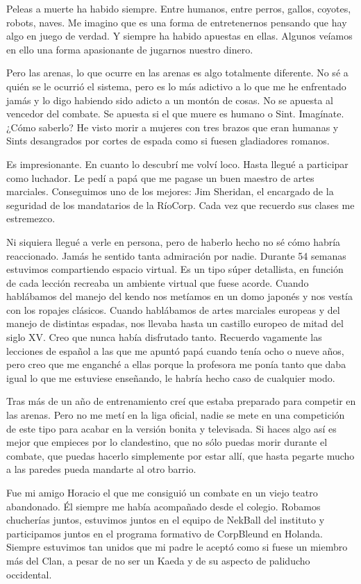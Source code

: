 Peleas a muerte ha habido siempre. Entre humanos, entre perros, gallos, coyotes, robots, naves. Me imagino que es una forma de entretenernos pensando que hay algo en juego de verdad. Y siempre ha habido apuestas en ellas. Algunos veíamos en ello una forma apasionante de jugarnos nuestro dinero. 

Pero las arenas, lo que ocurre en las arenas es algo totalmente diferente. No sé a quién se le ocurrió el sistema, pero es lo más adictivo a lo que me he enfrentado jamás y lo digo habiendo sido adicto a un montón de cosas. No se apuesta al vencedor del combate. Se apuesta si el que muere es humano o Sint. Imagínate. ¿Cómo saberlo? He visto morir a mujeres con tres brazos que eran humanas y Sints desangrados por cortes de espada como si fuesen gladiadores romanos. 

Es impresionante. En cuanto lo descubrí me volví loco. Hasta llegué a participar como luchador. Le pedí a papá que me pagase un buen maestro de artes marciales. Conseguimos uno de los mejores: Jim Sheridan, el encargado de la seguridad de los mandatarios de la RíoCorp. Cada vez que recuerdo sus clases me estremezco. 

Ni siquiera llegué a verle en persona, pero de haberlo hecho no sé cómo habría reaccionado. Jamás he sentido tanta admiración por nadie. Durante 54 semanas estuvimos compartiendo espacio virtual. Es un tipo súper detallista, en función de cada lección recreaba un ambiente virtual que fuese acorde. Cuando hablábamos del manejo del kendo nos metíamos en un domo japonés y nos vestía con los ropajes clásicos. Cuando hablábamos de artes marciales europeas y del manejo de distintas espadas, nos llevaba hasta un castillo europeo de mitad del siglo XV. Creo que nunca había disfrutado tanto. Recuerdo vagamente las lecciones de español a las que me apuntó papá cuando tenía ocho o nueve años, pero creo que me enganché a ellas porque la profesora me ponía tanto que daba igual lo que me estuviese enseñando, le habría hecho caso de cualquier modo. 

Tras más de un año de entrenamiento creí que estaba preparado para competir en las arenas. Pero no me metí en la liga oficial, nadie se mete en una competición de este tipo para acabar en la versión bonita y televisada. Si haces algo así es mejor que empieces por lo clandestino, que no sólo puedas morir durante el combate, que puedas hacerlo simplemente por estar allí, que hasta pegarte mucho a las paredes pueda mandarte al otro barrio.

Fue mi amigo Horacio el que me consiguió un combate en un viejo teatro abandonado. Él siempre me había acompañado desde el colegio. Robamos chucherías juntos, estuvimos juntos en el equipo de NekBall del instituto y participamos juntos en el programa formativo de CorpBleund en Holanda. Siempre estuvimos tan unidos que mi padre le aceptó como si fuese un miembro más del Clan, a pesar de no ser un Kaeda y de su aspecto de paliducho occidental.

